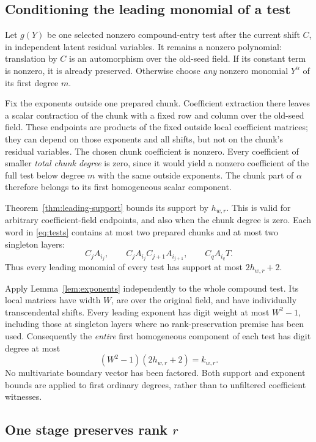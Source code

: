 \subsection{Conditioning the leading monomial of a test}

Let $g(Y)$ be one selected nonzero compound-entry test after the
current shift $C$, in independent latent residual variables. It
remains a nonzero polynomial: translation by $C$ is an automorphism
over the old-seed field. If its constant term is nonzero, it is already
preserved. Otherwise choose \emph{any} nonzero monomial $Y^\alpha$
of its first degree $m$.

Fix the exponents outside one prepared chunk. Coefficient extraction
there leaves a scalar contraction of the chunk with a fixed row and
column over the old-seed field. These endpoints are products of the
fixed outside local coefficient matrices; they can depend on those
exponents and all shifts, but not on the chunk's residual variables.
The chosen chunk coefficient is nonzero. Every coefficient of smaller
\emph{total chunk degree} is zero, since it would yield a nonzero
coefficient of the full test below degree $m$ with the same outside
exponents. The chunk part of $\alpha$ therefore belongs to its first
homogeneous scalar component.

Theorem~\ref{thm:leading-support} bounds its support by $h_{w,r}$.
This is valid for arbitrary coefficient-field endpoints, and also
when the chunk degree is zero. Each word in \eqref{eq:tests} contains
at most two prepared chunks and at most two singleton layers:
\[
 C_jA_{i_j},\qquad
 C_jA_{i_j}C_{j+1}A_{i_{j+1}},\qquad
 C_qA_{i_q}T.
\]
Thus every leading monomial of every test has support at most
$2h_{w,r}+2$.

Apply Lemma~\ref{lem:exponents} independently to the whole compound
test. Its local matrices have width $W$, are over the original field,
and have individually transcendental shifts. Every leading exponent
has digit weight at most $W^2-1$, including those at singleton layers
where no rank-preservation premise has been used. Consequently the
\emph{entire} first homogeneous component of each test has digit
degree at most
\[
 (W^2-1)(2h_{w,r}+2)=k_{w,r}.
\]
No multivariate boundary vector has been factored. Both support and
exponent bounds are applied to first ordinary degrees, rather than
to unfiltered coefficient witnesses.

\subsection{One stage preserves rank \texorpdfstring{$r$}{r}}


